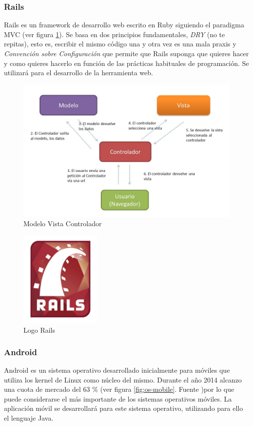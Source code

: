 		\subsubsection{Rails}
		Rails es un framework de desarrollo web escrito en Ruby siguiendo el paradigma \ac{MVC} (ver figura \ref{fig:mvc}). Se basa en dos principios fundamentales, \textit{\ac{DRY}} (no te repitas), esto es, escribir el mismo código una y otra vez es una mala praxis y \textit{Convención sobre Configuración} que permite que Rails suponga que quieres hacer y como quieres hacerlo en función de las prácticas habituales de programación. Se utilizará para el desarrollo de la herramienta web.
		
		\begin{figure}[h!btp]
		\centering
		\includegraphics[width=120mm, fbox={\fboxrule} 4mm]{images/04-metodo/07-mvc.jpg}
		\caption{Modelo Vista Controlador}
		\label{fig:mvc}
		\end{figure}
		
		\begin{figure}[H]
		\centering
		\includegraphics[width=40mm, fbox={\fboxrule} 4mm]{images/04-metodo/08-rails_logo.png}
		\caption{Logo Rails}
		\label{fig:rails-logo}
		\end{figure}
		
		\subsubsection{Android}
		Android es un sistema operativo desarrollado inicialmente para móviles que utiliza los kernel de Linux como núcleo del mismo. Durante el año 2014 alcanzo una cuota de mercado del 63 \% (ver figura \ref{fig:os-mobile}. Fuente \cite{Are15})por lo que puede considerarse el más importante de los sistemas operativos móviles. 
		La aplicación móvil se desarrollará para este sistema operativo, utilizando para ello el lenguaje Java.
		
